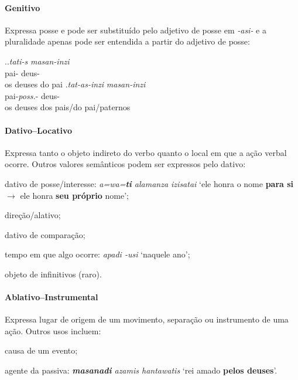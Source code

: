 \paragraph{Genitivo}
Expressa posse e pode ser substituído pelo adjetivo de posse em \emph{-asi-} e a
pluralidade apenas pode ser entendida a partir do adjetivo de posse:

\ex.\ag.\emph{tati-s} \emph{masan-inzi}\\
pai-\Gen\Sg\Com{} deus-\Nom\Pl\Com{}\\
os deuses do pai 
\bg.\emph{tat-as-inzi} \emph{masan-inzi}\\
pai-\emph{poss.}-\Nom\Pl\Com{} deus-\Nom\Pl\Com{}\\
os deuses dos pais\slash{}do pai\slash{}paternos


\paragraph{Dativo--Locativo}
Expressa tanto o objeto indireto do verbo quanto o local em que a ação verbal
ocorre. Outros valores semânticos podem ser expressos pelo dativo:
\begin{inparaenum}[(a)]
\item dativo de posse\slash{}interesse: \emph{a=wa=\textbf{ti} alamanza izisatai} `ele
	honra o nome \textbf{para si} $\rightarrow$ ele honra \textbf{seu próprio} nome';
\item  direção\slash{}alativo;
\item dativo de comparação;
\item tempo em que algo ocorre: \emph{apadi -usi} `naquele ano';
\item objeto de infinitivos (raro).
\end{inparaenum}


\paragraph{Ablativo--Instrumental}
Expressa lugar de origem de um movimento, separação ou instrumento de uma ação.
Outros usos incluem:
\begin{inparaenum}[(a)]
\item causa de um evento;
\item agente da passiva: \emph{\textbf{masanadi} azamis hantawatis} `rei amado 
	\textbf{pelos deuses}'.
\end{inparaenum}


